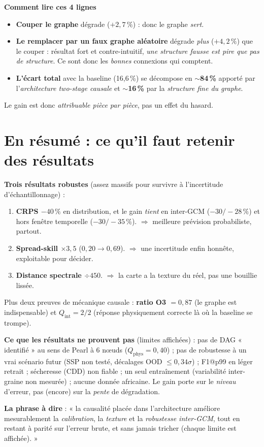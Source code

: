 \documentclass[11pt,a4paper]{article}
\newcommand{\bloc}[1]{\par\smallskip\noindent\textcolor{accent}{\textbf{#1}}\quad}
\begin{document}
\smallskip
\bloc{Comment lire ces 4 lignes}
\begin{itemize}[nosep]
  \item \textbf{Couper le graphe} dégrade ($+2{,}7\,\%$) : donc le graphe \emph{sert}.
  \item \textbf{Le remplacer par un faux graphe aléatoire} dégrade \emph{plus} ($+4{,}2\,\%$) que le couper : résultat fort et contre-intuitif, \emph{une structure fausse est pire que pas de structure}. Ce sont donc les \emph{bonnes} connexions qui comptent.
  \item \textbf{L'écart total} avec la baseline (16,6\,\%) se décompose en $\sim$\textbf{84\,\%} apporté par l'\emph{architecture two-stage causale} et $\sim$\textbf{16\,\%} par la \emph{structure fine du graphe}.
\end{itemize}
Le gain est donc \emph{attribuable pièce par pièce}, pas un effet du hasard.

\section*{En résumé : ce qu'il faut retenir des résultats}

\begin{resultbox}
\textbf{Trois résultats robustes} (assez massifs pour survivre à l'incertitude d'échantillonnage) :
\begin{enumerate}[nosep]
  \item \textbf{CRPS $-40\,\%$} en distribution, et le gain \emph{tient} en inter-GCM ($-30/-28\,\%$) et hors fenêtre temporelle ($-30/-35\,\%$). $\Rightarrow$ meilleure prévision probabiliste, partout.
  \item \textbf{Spread-skill $\times 3{,}5$} ($0{,}20 \to 0{,}69$). $\Rightarrow$ une incertitude enfin honnête, exploitable pour décider.
  \item \textbf{Distance spectrale $\div 450$}. $\Rightarrow$ la carte a la texture du réel, pas une bouillie lissée.
\end{enumerate}
Plus deux preuves de mécanique causale : \textbf{ratio O3 $=0{,}87$} (le graphe est indispensable) et \textbf{$Q_{\mathrm{int}}=2/2$} (réponse physiquement correcte là où la baseline se trompe).

\medskip
\textbf{Ce que les résultats ne prouvent pas} (limites affichées) : pas de DAG « identifié » au sens de Pearl à 6 n\oe uds ($Q_{\mathrm{phys}}=0{,}40$) ; pas de robustesse à un vrai scénario futur (SSP non testé, décalages OOD $\leq 0{,}34\sigma$) ; F1@p99 en léger retrait ; sécheresse (CDD) non fiable ; un seul entraînement (variabilité inter-graine non mesurée) ; aucune donnée africaine. Le gain porte sur le \emph{niveau} d'erreur, pas (encore) sur la \emph{pente} de dégradation.

\medskip
\textbf{La phrase à dire} : « la causalité placée dans l'architecture améliore mesurablement la \emph{calibration}, la \emph{texture} et la \emph{robustesse inter-GCM}, tout en restant à parité sur l'erreur brute, et sans jamais tricher (chaque limite est affichée). »
\end{resultbox}
\end{document}
